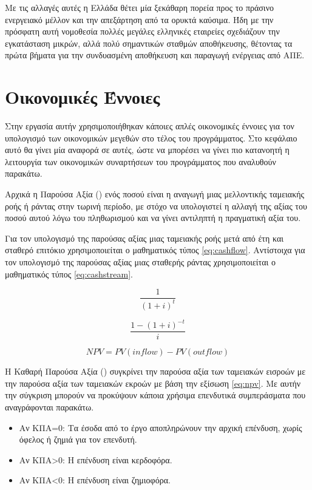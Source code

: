 \documentclass[12pt]{report}
\begin{document}
Με τις αλλαγές αυτές η Ελλάδα θέτει μία ξεκάθαρη πορεία προς το πράσινο ενεργειακό μέλλον και την απεξάρτηση από τα ορυκτά καύσιμα. Ήδη με την
πρόσφατη αυτή νομοθεσία πολλές μεγάλες ελληνικές εταιρείες σχεδιάζουν την εγκατάσταση μικρών, αλλά πολύ σημαντικών σταθμών αποθήκευσης, θέτοντας τα πρώτα βήματα για την συνδυασμένη αποθήκευση και παραγωγή ενέργειας από ΑΠΕ.

\pagebreak
\section*{Οικονομικές Έννοιες}
Στην εργασία αυτήν χρησιμοποιήθηκαν κάποιες απλές οικονομικές έννοιες για τον υπολογισμό των οικονομικών μεγεθών στο τέλος του προγράμματος. Στο κεφάλαιο αυτό θα γίνει μία αναφορά σε αυτές, ώστε να μπορέσει να γίνει πιο κατανοητή η 
λειτουργία των οικονομικών συναρτήσεων του προγράμματος που αναλυθούν παρακάτω.

Αρχικά η Παρούσα Αξία ({}) ενός ποσού είναι η αναγωγή μιας μελλοντικής ταμειακής ροής ή ράντας στην τωρινή περίοδο, με στόχο να υπολογιστεί η αλλαγή της αξίας του ποσού αυτού λόγω του πληθωρισμού 
και να γίνει αντιληπτή η πραγματική αξία του.

Για τον υπολογισμό της παρούσας αξίας μιας ταμειακής ροής μετά από {} έτη και σταθερό επιτόκιο {} χρησιμοποιείται ο μαθηματικός τύπος \ref{eq:cashflow}. Αντίστοιχα για τον υπολογισμό της παρούσας αξίας 
μιας σταθερής ράντας χρησιμοποιείται ο μαθηματικός τύπος \ref{eq:cashstream}.

\begin{equation}
	\frac{1}{(1+i)^t}
\label{eq:cashflow}
\end{equation}

\begin{equation}
	\frac{1- (1+i)^{-t}}{i}
\label{eq:cashstream}
\end{equation}

\begin{equation}
	NPV = PV(inflow) - PV(outflow)
\label{eq:npv}
\end{equation}

Η Καθαρή Παρούσα Αξία ({}) συγκρίνει την παρούσα αξία των ταμειακών εισροών με την παρούσα αξία των ταμειακών εκροών με βάση την εξίσωση \ref{eq:npv}. Με αυτήν την σύγκριση μπορούν να προκύψουν 
κάποια χρήσιμα επενδυτικά συμπεράσματα που αναγράφονται παρακάτω.

\begin{itemize}
\item Αν ΚΠΑ=0: Τα έσοδα από το έργο αποπληρώνουν την αρχική επένδυση, χωρίς όφελος ή ζημιά για τον επενδυτή.
\item Αν ΚΠΑ\textgreater 0: Η επένδυση είναι κερδοφόρα.
\item Αν ΚΠΑ\textless 0: Η επένδυση είναι ζημιοφόρα.
\end{itemize}
\end{document}
